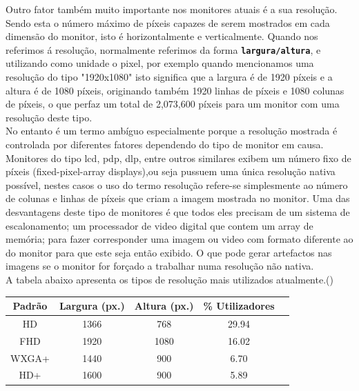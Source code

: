 \documentclass[a4paper]{report}
\begin{document}
Outro fator também muito importante nos monitores atuais é a sua resolução. Sendo esta o número máximo de píxeis capazes de serem mostrados em cada dimensão do monitor, isto é horizontalmente e verticalmente. Quando nos referimos á resolução, normalmente referimos da forma \textbf{\texttt{largura/altura}}, e utilizando como unidade o pixel, por exemplo quando mencionamos uma resolução do tipo "1920x1080" isto significa que a largura é de 1920 píxeis e a altura é de 1080 píxeis, originando também 1920 linhas de píxeis e 1080 colunas de píxeis, o que perfaz um total de 2,073,600 píxeis para um monitor com uma resolução deste tipo.\\ No entanto é um termo ambíguo especialmente porque a resolução mostrada é controlada por diferentes fatores dependendo do tipo de monitor em causa.\\ Monitores do tipo \ac{lcd}, \ac{pdp}, \ac{dlp}, entre outros similares exibem um número fixo de píxeis (fixed-pixel-array displays),ou seja pussuem uma única resolução nativa possível, nestes casos o uso do termo resolução refere-se simplesmente ao número de colunas e linhas de píxeis que criam a imagem mostrada no monitor. Uma das desvantagens deste tipo de monitores é que todos eles precisam de um sistema de escalonamento; um processador de video digital que contem um array de memória; para fazer corresponder uma imagem ou video com formato diferente ao do monitor para que este seja então exibido. O que pode gerar artefactos nas imagens se o monitor for forçado a trabalhar numa resolução não nativa.\\
A tabela abaixo apresenta os tipos de resolução mais utilizados atualmente.(\cite{dr})
\begin{center}
\begin{tabular}{c|c|c|c|c}\\

Padrão & Largura (px.) & Altura (px.) & \% Utilizadores \\ \hline

HD & 1366 & 768 & 29.94\\ 

FHD & 1920 & 1080 & 16.02\\

WXGA+ & 1440 & 900 & 6.70\\

HD+ & 1600 & 900 & 5.89\\ 

\end{tabular}
\end{center}
\end{document}
